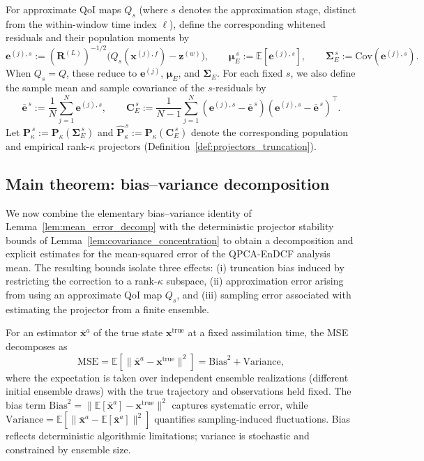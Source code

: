 \documentclass[11pt,a4paper]{article}
\begin{document}
For approximate QoI maps $Q_s$ (where $s$ denotes the approximation stage, distinct from the within-window time index $\ell$), define the corresponding whitened residuals and their population moments by
\begin{equation}
\mathbf{e}^{(j),s}:=(\mathbf{R}^{(L)})^{-1/2}\bigl(Q_s(\mathbf{x}^{(j),f})-\mathbf{z}^{(w)}\bigr),
\qquad
\boldsymbol{\mu}_E^{\,s}:=\mathbb{E}[\mathbf{e}^{(j),s}],
\qquad
\boldsymbol{\Sigma}_E^{\,s}:=\mathrm{Cov}(\mathbf{e}^{(j),s}).
\end{equation}
When $Q_s=Q$, these reduce to $\mathbf{e}^{(j)}$, $\boldsymbol{\mu}_E$, and $\boldsymbol{\Sigma}_E$.
For each fixed $s$, we also define the sample mean and sample covariance of the $s$-residuals by
\begin{equation}
\bar{\mathbf{e}}^{\,s}:=\frac{1}{N}\sum_{j=1}^N \mathbf{e}^{(j),s},
\qquad
\mathbf{C}_E^{\,s}:=\frac{1}{N-1}\sum_{j=1}^N(\mathbf{e}^{(j),s}-\bar{\mathbf{e}}^{\,s})(\mathbf{e}^{(j),s}-\bar{\mathbf{e}}^{\,s})^\top.
\end{equation}
Let $\mathbf{P}_\kappa^{\,s}:=\mathbf{P}_\kappa(\boldsymbol{\Sigma}_E^{\,s})$ and $\hat{\mathbf{P}}_\kappa^{\,s}:=\mathbf{P}_\kappa(\mathbf{C}_E^{\,s})$ denote the corresponding population and empirical rank-$\kappa$ projectors (Definition~\ref{def:projectors_truncation}).

\subsection{Main theorem: bias--variance decomposition}
\label{subsec:main_bv}

We now combine the elementary bias--variance identity of Lemma~\ref{lem:mean_error_decomp} with the deterministic projector stability bounds of Lemma~\ref{lem:covariance_concentration} to obtain a decomposition and explicit estimates for the mean-squared error of the QPCA-EnDCF analysis mean. The resulting bounds isolate three effects: (i) truncation bias induced by restricting the correction to a rank-$\kappa$ subspace, (ii) approximation error arising from using an approximate QoI map $Q_s$, and (iii) sampling error associated with estimating the projector from a finite ensemble.

For an estimator $\bar{\mathbf{x}}^a$ of the true state $\mathbf{x}^{\mathrm{true}}$ at a fixed assimilation time, the MSE decomposes as
\begin{equation}
\mathrm{MSE}
=
\mathbb{E}\!\left[\|\bar{\mathbf{x}}^a-\mathbf{x}^{\mathrm{true}}\|^2\right]
=
\mathrm{Bias}^2+\mathrm{Variance},
\label{eq:mse_decomposition_empirical}
\end{equation}
where the expectation is taken over independent ensemble realizations (different initial ensemble draws) with the true trajectory and observations held fixed. The bias term
$\mathrm{Bias}^2=\|\mathbb{E}[\bar{\mathbf{x}}^a]-\mathbf{x}^{\mathrm{true}}\|^2$
captures systematic error, while
$\mathrm{Variance}=\mathbb{E}[\|\bar{\mathbf{x}}^a-\mathbb{E}[\bar{\mathbf{x}}^a]\|^2]$
quantifies sampling-induced fluctuations. Bias reflects deterministic algorithmic limitations; variance is stochastic and constrained by ensemble size.
\end{document}
